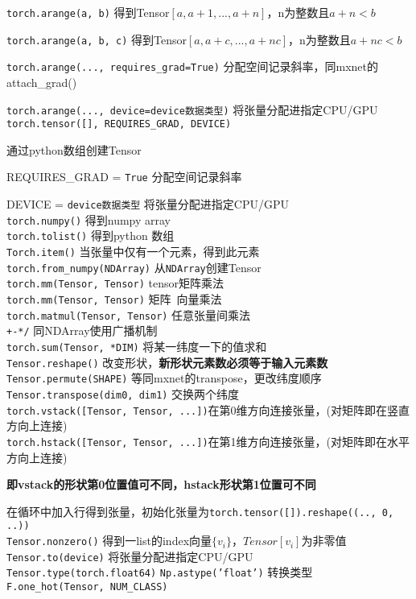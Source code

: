 \documentclass[UTF8]{ctexart}
\begin{document}
  \texttt{torch.arange(a, b)} 得到Tensor$[a, a+1, ..., a+n]$，n为整数且$a+n < b$

  \texttt{torch.arange(a, b, c)} 得到Tensor$[a, a+c, ..., a+nc]$，n为整数且$a+nc < b$
  
  \texttt{torch.arange(..., requires\_grad=True)} 分配空间记录斜率，同mxnet的attach\_grad()
  
  \texttt{torch.arange(..., device=device数据类型)} 将张量分配进指定CPU/GPU\\
\texttt{torch.tensor([], REQUIRES\_GRAD, DEVICE)}
  
  通过python数组创建Tensor

  REQUIRES\_GRAD = \texttt{True} 分配空间记录斜率
  
  DEVICE = \texttt{device数据类型} 将张量分配进指定CPU/GPU\\
\texttt{torch.numpy()} 得到numpy array \\
\texttt{torch.tolist()} 得到python 数组 \\
\texttt{Torch.item()} 当张量中仅有一个元素，得到此元素 \\
\texttt{torch.from\_numpy(NDArray)} 从\texttt{NDArray}创建Tensor\\
\texttt{torch.mm(Tensor, Tensor)} tensor矩阵乘法\\
\texttt{torch.mm(Tensor, Tensor)} 矩阵\ 向量乘法\\
\texttt{torch.matmul(Tensor, Tensor)} 任意张量间乘法\\
\texttt{+-*/} 同NDArray使用广播机制\\
\texttt{torch.sum(Tensor, *DIM)} 将某一纬度一下的值求和\\
\texttt{Tensor.reshape()} 改变形状，\textbf{新形状元素数必须等于输入元素数}\\
\texttt{Tensor.permute(SHAPE)} 等同mxnet的transpose，更改纬度顺序\\
\texttt{Tensor.transpose(dim0, dim1)} 交换两个纬度\\
\texttt{torch.vstack([Tensor, Tensor, ...])}在第0维方向连接张量，(对矩阵即在竖直方向上连接)\\
\texttt{torch.hstack([Tensor, Tensor, ...])}在第1维方向连接张量，(对矩阵即在水平方向上连接)

  \textbf{即vstack的形状第0位置值可不同，hstack形状第1位置可不同}

  在循环中加入行得到张量，初始化张量为\texttt{torch.tensor([]).reshape((.., 0, ..))}\\
\texttt{Tensor.nonzero()} 得到一list的index向量$\{v_i\}$，$Tensor[v_i]$为非零值\\
\texttt{Tensor.to(device)} 将张量分配进指定CPU/GPU\\
\texttt{Tensor.type(torch.float64)} \texttt{Np.astype('float')} 转换类型\\
\texttt{F.one\_hot(Tensor, NUM\_CLASS)} 
\end{document}
